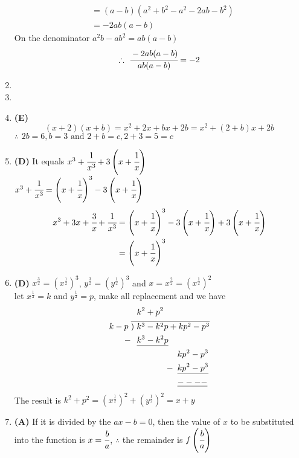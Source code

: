 \begin{multicols}{2}
\begin{enumerate}[label={\textbf{\arabic*.}}]
\begin{align*}
        & = (a-b)(a^2 + b^2 - a^2 -2ab -b^2) \\
        &= -2ab(a-b)
     \end{align*}
On the denominator $a^2b -ab^2 = ab(a-b)$ \\
$$\therefore \,\, \cfrac{-2ab(a-b)}{ab(a-b)}= -2$$
\item 
\item 
\item \textbf{(E)} $$(x+2)(x+b) = x^2 + 2x + bx + 2b = x^2 + (2 +b)x + 2b$$
$\therefore \,\, 2b = 6,b = 3 \text{ and } 2 + b = c, 2+ 3 = 5 = c$
\item \textbf{(D)} It equals $x^3 + \cfrac{1}{x^3} + 3\left(x+ \cfrac{1}{x}\right)$ \\
$x^3 + \cfrac{1}{x^3}= \left(x + \cfrac{1}{x}\right)^3 - 3\left(x + \cfrac{1}{x}\right)$ \\
\begin{align*} 
   x^3 + 3x + \cfrac{3}{x} + \cfrac{1}{x^3} &= \left(x + \cfrac{1}{x}\right)^3 - 3\left(x + \cfrac{1}{x}\right) +3\left(x+ \cfrac{1}{x}\right) \\
   & = \left(x + \cfrac{1}{x}\right)^3
\end{align*}
\item \textbf{(D)} $x^{\frac{3}{2}} = (x^{\frac{1}{2}})^3$, $y^{\frac{3}{2}} = (y^{\frac{1}{2}})^3$ and $x = x^{\frac{2}{2}} = (x^{\frac{1}{2}})^{2}$ \\
let $x^{\frac{1}{2}} = k$ and $y^{\frac{1}{2}} = p$, make all replacement and we have
\begin{align*}
    & \hspace{7pt} k^2 + p^2 \\
    k - p \hspace{3pt} & \overline{)\hspace{3pt} k^3  -k^2p  + kp^2 -p^3} \\
    -& \hspace{7pt} \underline{k^3 -k^2p} \\
     & \hspace{55pt} kp^2 - p^3 \\
     -\hspace{-50pt} & \hspace{55pt} \underline{kp^2 - p^3} \\
     & \hspace{55pt} \underline{----} 
\end{align*}
The result is $k^2 + p^2 = (x^{\frac{1}{2}})^2 + (y^{\frac{1}{2}})^2 = x + y$
\item \textbf{(A)} If it is divided by the $ax-b = 0$, then the value of $x$ to be substituted into the function is $x = \cfrac{b}{a}$, $\therefore$  the remainder is  $f\left(\cfrac{b}{a}\right)$
\end{enumerate}
\end{multicols}